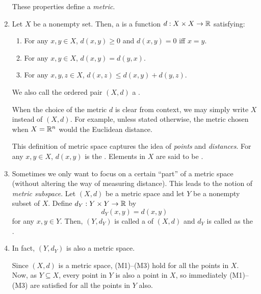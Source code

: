 \begin{enumerate}
\begin{itemize}
\begin{center}
\end{center}
\end{itemize}
These properties define a \emph{metric}.
\item Let \(X\) be a nonempty set. Then, a  is a function
\(d:X\times X\to\mathbb{R}\) satisfying:
\begin{enumerate}[label={(M\arabic*)}]
\item For any \(x,y\in X\), \(d(x,y)\ge 0\) and \(d(x,y)=0\) iff \(x=y\).
\item For any \(x,y\in X\), \(d(x,y)=d(y,x)\).
\item For any \(x,y,z\in X\), \(d(x,z)\le d(x,y)+d(y,z)\).
\end{enumerate}
We also call the ordered pair \((X,d)\) a .

\begin{note}
When the choice of the metric \(d\) is clear from context, we may simply write
\(X\) instead of \((X,d)\). For example, unless stated otherwise, the metric
chosen when \(X=\mathbb{R}^n\) would the Euclidean distance.
\end{note}

This definition of metric space captures the idea of \emph{points} and
\emph{distances}. For any \(x,y\in X\), \(d(x,y)\) is the . Elements in \(X\) are said to
be .

\item Sometimes we only want to focus on a certain ``part'' of a metric space
(without altering the way of measuring distance). This leads to the notion of
\emph{metric subspace}. Let \((X,d)\) be a metric space and let \(Y\) be a
nonempty subset of \(X\). Define \(d_Y:Y\times  Y\to \mathbb{R}\) by
\[
d_Y(x,y)=d(x,y)
\]
for any \(x,y\in Y\). Then, \((Y,d_Y)\) is called a  of
\((X,d)\) and \(d_Y\) is called as the .

\item\label{it:metric-subspace-is-ms} In fact, \((Y,d_Y)\) is also a metric space.

\begin{pf}
Since \((X,d)\) is a metric space, (M1)--(M3) hold for all the points in \(X\).
Now, as \(Y\subseteq X\), every point in \(Y\) is also a point in \(X\), so
immediately (M1)--(M3) are satisfied for all the points in \(Y\) also.
\end{pf}
\end{enumerate}
